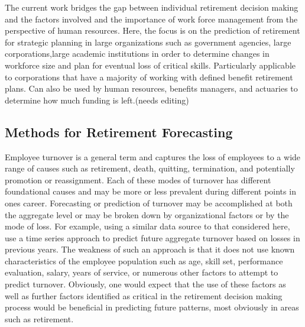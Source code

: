 \documentclass[12pt,letterpaper]{article}
\begin{document}
The current work bridges the gap between individual retirement decision making and the factors involved and the importance of work force management from the perspective of human resources.  Here, the focus is on the prediction of retirement for strategic planning in large organizations such as government agencies, large corporations,large academic institutions in order to determine changes in workforce size and plan for eventual loss of critical skills.  Particularly applicable to corporations that have a majority of working with defined benefit retirement plans.   Can also be used by human resources, benefits managers, and actuaries to determine how much funding is left.(needs editing)

\subsection{Methods for Retirement Forecasting}

Employee turnover is a general term and captures the loss of employees to a wide range of causes such as retirement, death, quitting, termination, and potentially promotion or reassignment. Each of these modes of turnover has different foundational causes and may be more or less prevalent during different points in ones career.  Forecasting or prediction of turnover may be accomplished at both the aggregate level or may be broken down by organizational factors or by the mode of loss.  For example, using a similar data source to that considered here, \citet{zhu2015} use a time series approach to predict future aggregate turnover based on losses in previous years.  The weakness of such an approach is that it does not use known characteristics of the employee population such as age, skill set, performance evaluation, salary, years of service, or numerous other factors to attempt to predict turnover.  Obviously, one would expect that the use of these factors as well as further factors identified as critical in the retirement decision making process \citet{Wang2010} would be beneficial in predicting future patterns, most obviously in areas such as retirement.
\end{document}
